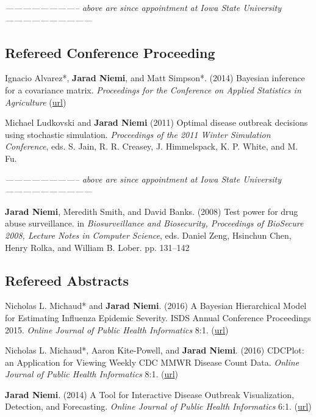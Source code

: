 \documentclass[overlapped,line]{res}
\newcommand{\sinceappt}{\emph{-------------------------- above are since appointment at Iowa State University ------------------------------}}
\newcommand{\sinceappt}{}
\begin{document}
\begin{resume}
\sinceappt

\subsection{\bf Refereed Conference Proceeding} \vspace{-0.2in}

Ignacio Alvarez*, {\bf Jarad Niemi}, and Matt Simpson*. (2014) Bayesian inference for a covariance matrix. \emph{Proceedings for the Conference on Applied Statistics in Agriculture} (\href{http://newprairiepress.org/agstatconference/2014/proceedings/8/}{url})

Michael Ludkovski and {\bf Jarad Niemi} (2011) Optimal disease outbreak decisions using stochastic simulation. \emph{Proceedings of the 2011 Winter Simulation Conference}, eds. S. Jain, R. R. Creasey, J. Himmelspack, K. P. White, and M. Fu.

\sinceappt

{\bf Jarad Niemi}, Meredith Smith, and David Banks. (2008) Test power for drug abuse surveillance. in \emph{Biosurveillance and Biosecurity, Proceedings of BioSecure 2008, Lecture Notes in Computer Science},  eds. Daniel Zeng, Hsinchun Chen, Henry Rolka, and William B. Lober. pp. 131--142



\subsection{\bf Refereed Abstracts} \vspace{-0.2in}

Nicholas L. Michaud* and {\bf Jarad Niemi}. (2016) A Bayesian Hierarchical Model for Estimating Influenza Epidemic Severity. ISDS Annual Conference Proceedings 2015. \emph{Online Journal of Public Health Informatics} 8:1. (\href{http://ojphi.org/ojs/index.php/ojphi/article/view/6438}{url})

Nicholas L. Michaud*, Aaron Kite-Powell, and {\bf Jarad Niemi}. (2016) CDCPlot: an Application for Viewing Weekly CDC MMWR Disease Count Data. \emph{Online Journal of Public Health Informatics} 8:1. (\href{http://ojphi.org/ojs/index.php/ojphi/article/view/6556}{url})

{\bf Jarad Niemi}. (2014) A Tool for Interactive Disease Outbreak Visualization, Detection, and Forecasting. \emph{Online Journal of Public Health Informatics} 6:1. (\href{http://ojphi.org/article/view/5017}{url})


\end{resume}
\end{document}
